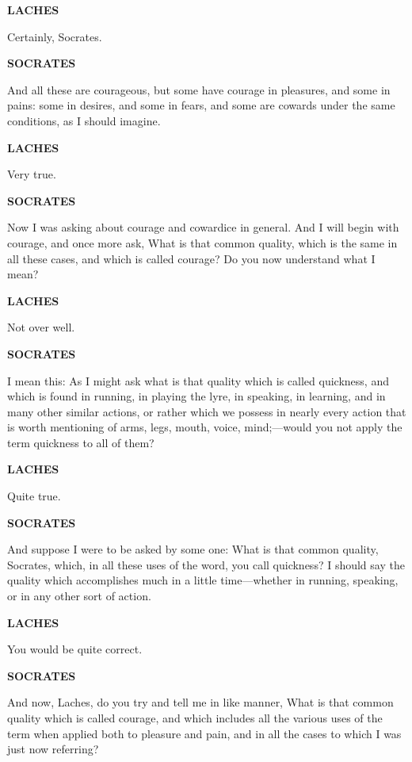 \documentclass[11pt,letter]{article}
\begin{document}
\par \textbf{LACHES}
\par   Certainly, Socrates.

\par \textbf{SOCRATES}
\par   And all these are courageous, but some have courage in pleasures, and some in pains:  some in desires, and some in fears, and some are cowards under the same conditions, as I should imagine.

\par \textbf{LACHES}
\par   Very true.

\par \textbf{SOCRATES}
\par   Now I was asking about courage and cowardice in general. And I will begin with courage, and once more ask, What is that common quality, which is the same in all these cases, and which is called courage? Do you now understand what I mean?

\par \textbf{LACHES}
\par   Not over well.

\par \textbf{SOCRATES}
\par   I mean this:  As I might ask what is that quality which is called quickness, and which is found in running, in playing the lyre, in speaking, in learning, and in many other similar actions, or rather which we possess in nearly every action that is worth mentioning of arms, legs, mouth, voice, mind;—would you not apply the term quickness to all of them?

\par \textbf{LACHES}
\par   Quite true.

\par \textbf{SOCRATES}
\par   And suppose I were to be asked by some one:  What is that common quality, Socrates, which, in all these uses of the word, you call quickness? I should say the quality which accomplishes much in a little time—whether in running, speaking, or in any other sort of action.

\par \textbf{LACHES}
\par   You would be quite correct.

\par \textbf{SOCRATES}
\par   And now, Laches, do you try and tell me in like manner, What is that common quality which is called courage, and which includes all the various uses of the term when applied both to pleasure and pain, and in all the cases to which I was just now referring?
\end{document}
